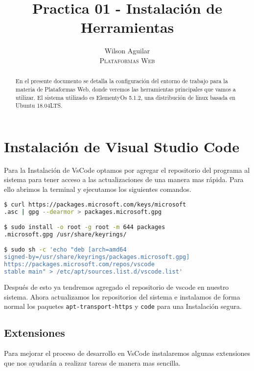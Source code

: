 \documentclass[12pt]{article}
\title{Practica 01 - Instalación de Herramientas }
\author{ 
    Wilson Aguilar \\
    \textsc{Plataformas Web} 
}
\begin{document}
\maketitle

\begin{abstract}
    En el presente documento se detalla la configuración del entorno de trabajo para la materia de Plataformas Web, donde veremos las herramientas principales que vamos a utilizar. El sistema utilizado es ElementyOs 5.1.2, una distribución de linux basada en Ubuntu 18.04LTS.
\end{abstract}

\section{Instalación de Visual Studio Code}

Para la Instalación de VsCode optamos por agregar el repositorio del programa al sistema para tener acceso a las actualizaciones de una manera mas rápida.
Para ello abrimos la terminal y ejecutamos los siguientes comandos.

\begin{lstlisting}[language=bash]
$ curl https://packages.microsoft.com/keys/microsoft
.asc | gpg --dearmor > packages.microsoft.gpg

$ sudo install -o root -g root -m 644 packages
.microsoft.gpg /usr/share/keyrings/

$ sudo sh -c 'echo "deb [arch=amd64 
signed-by=/usr/share/keyrings/packages.microsoft.gpg] 
https://packages.microsoft.com/repos/vscode 
stable main" > /etc/apt/sources.list.d/vscode.list'

\end{lstlisting}

Después de esto ya tendremos agregado el repositorio de vscode en nuestro sistema. Ahora actualizamos los repositorios del sistema e instalamos de forma normal los paquetes \lstinline{apt-transport-https} y \lstinline{code} para una Instalación segura.

\subsection{Extensiones}
Para mejorar el proceso de desarrollo en VsCode instalaremos algunas extensiones que nos ayudarán a realizar tareas de manera mas sencilla.
\end{document}
